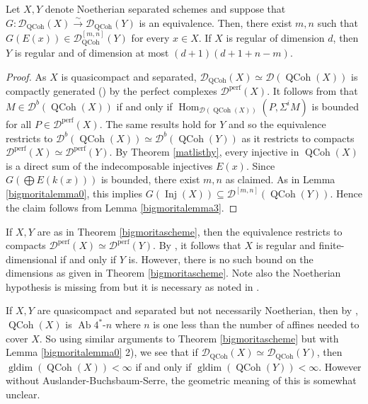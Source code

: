 \documentclass[12pt,oneside]{amsart}
\DeclareMathOperator*{\Inj}{Inj}
\DeclareMathOperator{\Hom}{Hom}
\DeclareMathOperator{\QCoh}{QCoh}
\DeclareMathOperator{\perf}{perf}
\DeclareMathOperator{\gldim}{gldim}
\DeclareMathOperator{\Ab}{Ab}
\begin{document}
\begin{theorem} \label{bigmoritascheme}
Let $X,Y$ denote Noetherian separated schemes and suppose that $G: \mathcal{D}_{\QCoh}(X) \xrightarrow{\sim} \mathcal{D}_{\QCoh}(Y)$ is an equivalence. Then, there exist $m,n$ such that $G(E(x)) \in \mathcal{D}_{\QCoh}^{[m,n]}(Y)$ for every $x \in X$. If $X$ is regular of dimension $d$, then $Y$ is regular and of dimension at most $(d+1)(d+1 + n-m)$. 
\end{theorem}

\begin{proof}
As $X$ is quasicompact and separated, $\mathcal{D}_{\QCoh}(X) \simeq \mathcal{D}(\QCoh(X))$ is compactly generated (\cite[Proposition 2.5]{NeeGroth}) by the perfect complexes $\mathcal{D}^{\perf}(X)$. It follows from \cite[Proposition 7.0.2]{BNP13} that $M \in \mathcal{D}^b(\QCoh(X))$ if and only if $\Hom_{\mathcal{D}(\QCoh(X))}(P,\Sigma^i M)$ is bounded for all $P \in \mathcal{D}^{\perf}(X)$. The same results hold for $Y$ and so the equivalence restricts to $\mathcal{D}^b(\QCoh(X)) \simeq \mathcal{D}^b(\QCoh(Y))$ as it restricts to compacts $\mathcal{D}^{\perf}(X) \simeq \mathcal{D}^{\perf}(Y)$. By Theorem \ref{matlisthy}, every injective in $\QCoh(X)$ is a direct sum of the indecomposable injectives $E(x)$. Since $G(\bigoplus E(k(x)))$ is bounded, there exist $m,n$ as claimed. As in Lemma \ref{bigmoritalemma0}, this implies $G(\Inj(X)) \subseteq \mathcal{D}^{[m,n]}(\QCoh(Y))$. Hence the claim follows from Lemma \ref{bigmoritalemma3}.
\end{proof}

\begin{remark}
If $X,Y$ are as in Theorem \ref{bigmoritascheme}, then the equivalence restricts to compacts  $\mathcal{D}^{\perf}(X) \simeq \mathcal{D}^{\perf}(Y)$. By \cite[Theorem 0.5]{Nee21b}, it follows that $X$ is regular and finite-dimensional if and only if $Y$ is. However, there is no such bound on the dimensions as given in Theorem \ref{bigmoritascheme}. Note also the Noetherian hypothesis is missing from \cite[Theorem 0.5]{Nee21b} but it is necessary as noted in \cite{Ste25}.
\end{remark}

\begin{remark}
If $X,Y$ are quasicompact and separated but not necessarily Noetherian, then by \cite[Theorem 1.4]{Pos26}, $\QCoh(X)$ is $\Ab4^\ast$-$n$ where $n$ is one less than the number of affines needed to cover $X$. So using similar arguments to Theorem \ref{bigmoritascheme} but with Lemma \ref{bigmoritalemma0} 2), we see that if $\mathcal{D}_{\QCoh}(X) \simeq \mathcal{D}_{\QCoh}(Y)$, then $\gldim(\QCoh(X)) < \infty$ if and only if $\gldim(\QCoh(Y)) < \infty$. However without Auslander-Buchsbaum-Serre, the geometric meaning of this is somewhat unclear. 
\end{remark}
\end{document}
